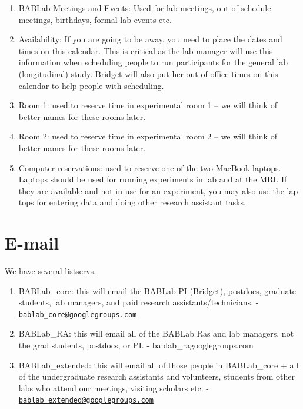 \documentclass[]{book}
\providecommand{\tightlist}{%
  \setlength{\itemsep}{0pt}\setlength{\parskip}{0pt}}
\begin{document}
\begin{enumerate}
\def\labelenumi{\arabic{enumi}.}
\item
  BABLab Meetings and Events: Used for lab meetings, out of schedule meetings, birthdays, formal lab events etc.
\item
  Availability: If you are going to be away, you need to place the dates and times on this calendar. This is critical as the lab manager will use this information when scheduling people to run participants for the general lab (longitudinal) study. Bridget will also put her out of office times on this calendar to help people with scheduling.
\item
  Room 1: used to reserve time in experimental room 1 -- we will think of better names for these rooms later.
\item
  Room 2: used to reserve time in experimental room 2 -- we will think of better names for these rooms later.
\item
  Computer reservations: used to reserve one of the two MacBook laptops. Laptops should be used for running experiments in lab and at the MRI. If they are available and not in use for an experiment, you may also use the lap tops for entering data and doing other research assistant tasks.
\end{enumerate}

\hypertarget{e-mail}{%
\section{E-mail}\label{e-mail}}

We have several listservs.

\begin{enumerate}
\def\labelenumi{\arabic{enumi}.}
\tightlist
\item
  BABLab\_core: this will email the BABLab PI (Bridget), postdocs, graduate students, lab managers, and paid research assistants/technicians. - \href{mailto:bablab_core@googlegroups.com}{\nolinkurl{bablab\_core@googlegroups.com}}
\item
  BABLab\_RA: this will email all of the BABLab Ras and lab managers, not the grad students, postdocs, or PI. - bablab\_ragooglegroups.com
\item
  BABLab\_extended: this will email all of those people in BABLab\_core + all of the undergraduate research assistants and volunteers, students from other labs who attend our meetings, visiting scholars etc. - \href{mailto:bablab_extended@googlegroups.com}{\nolinkurl{bablab\_extended@googlegroups.com}}
\end{enumerate}
\end{document}
